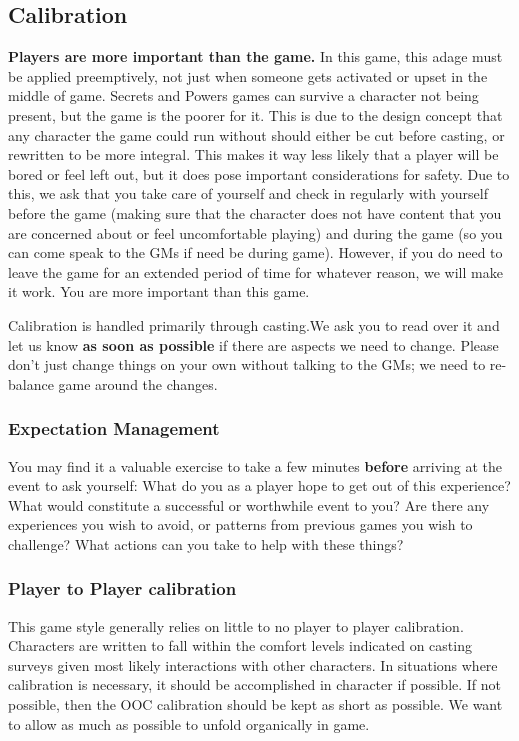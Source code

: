\documentclass[sheet]{GL2020}
\begin{document}
\subsection{Calibration}
\textbf{Players are more important than the game.} In this game, this adage must be applied preemptively, not just when someone gets activated or upset in the middle of game. Secrets and Powers games can survive a character not being present, but the game is the poorer for it. This is due to the design concept that any character the game could run without should either be cut before casting, or rewritten to be more integral. This makes it way less likely that a player will be bored or feel left out, but it does pose important considerations for safety. Due to this, we ask that you take care of yourself and check in regularly with yourself before the game (making sure that the character does not have content that you are concerned about or feel uncomfortable playing) and during the game (so you can come speak to the GMs if need be during game). However, if you do need to leave the game for an extended period of time for whatever reason, we will make it work. You are more important than this game.

Calibration is handled primarily through casting.We ask you to read over it and let us know \textbf{as soon as possible} if there are aspects we need to change. Please don't just change things on your own without talking to the GMs; we need to re-balance game around the changes.

\subsubsection{Expectation Management}
You may find it a valuable exercise to take a few minutes \textbf{before} arriving at the event to ask yourself: What do you as a player hope to get out of this experience? What would constitute a successful or worthwhile event to you? Are there any experiences you wish to avoid, or patterns from previous games you wish to challenge? What actions can you take to help with these things?

\subsubsection{Player to Player calibration}
This game style generally relies on little to no player to player calibration. Characters are written to fall within the comfort levels indicated on casting surveys given most likely interactions with other characters. In situations where calibration is necessary, it should be accomplished in character if possible. If not possible, then the OOC calibration should be kept as short as possible. We want to allow as much as possible to unfold organically in game.
\end{document}
